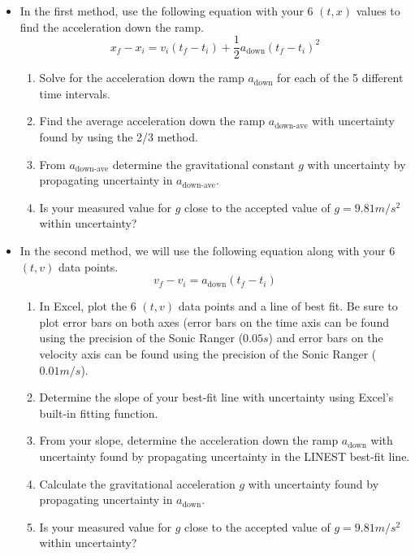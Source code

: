 \begin{itemize}
\item{In the first method, use the following equation with your 6 $(t,x)$ values to find the acceleration down the ramp.
\begin{equation}
    x_f - x_i =   v_{i}(t_f - t_i) + \frac{1}{2}a_\text{down}(t_f  - t_i )^2
\end{equation}
\begin{enumerate}
\item Solve for the acceleration down the ramp $a_\text{down}$ for each of the 5 different time intervals.
\item  Find the average acceleration down the ramp $a_{\text{down-ave}}$ with uncertainty found by using the 2/3 method.
\item From $a_\text{down-ave}$ determine the gravitational constant $g$ with uncertainty by propagating uncertainty in $a_{\text{down-ave}}$.
\item Is your measured value for $g$ close to the accepted value of $g=9.81 m/s^2$ within uncertainty?
\end{enumerate}
}
\item{In the second method, we will use the following equation along with your 6 $(t,v)$ data points.
\begin{equation}
    v_f - v_{i} = a_\text{down} (t_f - t_i)
\end{equation}
\begin{enumerate}
\item In Excel, plot the 6 $(t,v)$ data points and a line of best fit. Be sure to plot error bars on both axes (error bars on the time axis can be found using the precision of the Sonic Ranger ($0.05 s$) and error bars on the velocity axis can be found using the precision of the Sonic Ranger ($0.01 m/s$).
\item Determine the slope of your best-fit line with uncertainty using Excel's built-in fitting function.
\item From your slope, determine the acceleration down the ramp $a_{\text{down}}$ with uncertainty found by propagating uncertainty in the LINEST best-fit line.
\item Calculate the gravitational acceleration $g$ with uncertainty found by propagating uncertainty in $a_\text{down}$.
\item Is your measured value for $g$ close to the accepted value of $g=9.81 m/s^2$ within uncertainty?
\end{enumerate}
}
\end{itemize}
